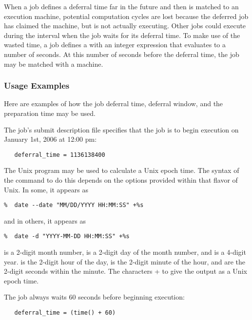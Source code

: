 When a job defines a deferral time far in the future and then 
is matched to an execution machine,
potential computation cycles are lost because the deferred job
has claimed the machine, but is not actually executing. 
Other jobs could execute during the interval when the job 
waits for its deferral time.
To make use of the wasted time,
a job defines a 
with an integer expression that evaluates to a
number of seconds.
At this number of seconds before the deferral time,
the job may be matched with a machine.

\subsubsection{Usage Examples}
\label{sec:JobDeferral-Examples}

Here are examples of how the job deferral time,
deferral window, and the preparation time may be used.

The job's submit description file specifies that
the job is to begin execution 
on January 1st, 2006 at 12:00 pm:

\begin{verbatim} 
   deferral_time = 1136138400
\end{verbatim} 

The Unix  program may be used to calculate
a Unix epoch time.
The syntax of the command to do this depends on the options provided
within that flavor of Unix.  In some, it appears as
\begin{verbatim} 
%  date --date "MM/DD/YYYY HH:MM:SS" +%s
\end{verbatim} 
and in others, it appears as 
\begin{verbatim} 
%  date -d "YYYY-MM-DD HH:MM:SS" +%s
\end{verbatim} 

\verb@MM@ is a 2-digit month number,
\verb@DD@ is a 2-digit day of the month number, and
\verb@YYYY@ is a 4-digit year.
\verb@HH@ is the 2-digit hour of the day,
\verb@MM@ is the 2-digit minute of the hour, and
\verb@SS@ are the 2-digit seconds within the minute.
The characters \verb@+%s@ tell the \Prog{date} program
to give the output as a Unix epoch time.

The job always waits 60 seconds before
beginning execution:

\begin{verbatim} 
   deferral_time = (time() + 60)
\end{verbatim}

